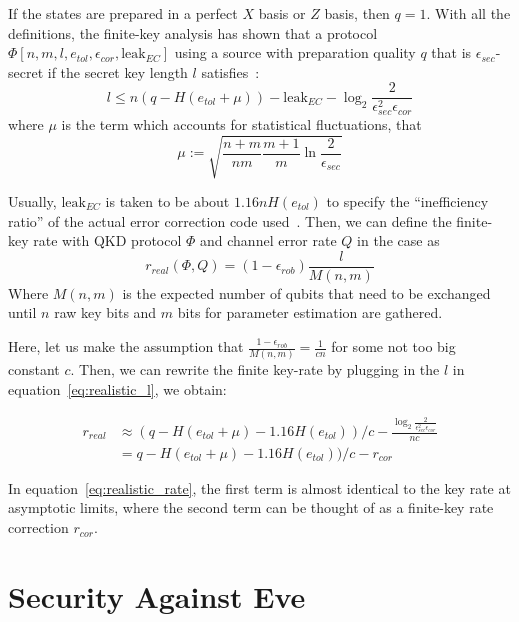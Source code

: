 \documentclass[%
 reprint,
superscriptaddress,
 amsmath,amssymb,
 aps,
]{revtex4-2}
\begin{document}
If the states are prepared in a perfect $X$ basis or $Z$ basis, then $q=1$. With all the definitions, the finite-key analysis has shown that a protocol $\Phi[n, m, l, e_{tol}, \epsilon_{cor}, \text{leak}_{EC}]$ using a source with  preparation quality $q$ that is $\epsilon_{sec}$-secret if the secret key length $l$ satisfies~\cite{Finite_key_analysis1}:
\begin{equation}
    l\le n(q-H(e_{tol}+\mu))-\text{leak}_{EC}-\log_2 \frac{2}{\epsilon_{sec}^2\epsilon_{cor}}
    \label{eq:realistic_l}
\end{equation}
where $\mu$ is the term which accounts for statistical fluctuations, that
\begin{equation}
    \mu := \sqrt{\frac{n+m}{nm}\frac{m+1}{m}\ln\frac{2}{\epsilon_{sec}}}
\end{equation}

Usually, $\text{leak}_{EC}$ is taken to be about $1.16nH(e_{tol})$ to specify the ``inefficiency ratio'' of the actual error correction code used~\cite{Finite_key_analysis1}. Then, we can define the finite-key rate with QKD protocol $\Phi$ and channel error rate $Q$ in the case as
\begin{equation}
    r_{real}(\Phi, Q) = (1-\epsilon_{rob}) \frac{l}{M(n, m)}
\end{equation}
Where $M(n, m)$ is the expected number of qubits that need to be exchanged until $n$ raw key bits and $m$ bits for parameter estimation are gathered.

Here, let us make the assumption that $\frac{1-\epsilon_{rob}}{M(n, m)}=\frac{1}{cn}$ for some not too big constant $c$. Then, we can rewrite the finite key-rate by plugging in the $l$ in equation~\ref{eq:realistic_l}, we obtain:

\begin{equation}
\begin{split}
    r_{real}&\approx (q-H(e_{tol}+\mu)-1.16H(e_{tol}))/c-\frac{\log_2 \frac{2}{\epsilon_{sec}^2\epsilon_{cor}}}{nc}\\
    &= q-H(e_{tol}+\mu)-1.16H(e_{tol}))/c-r_{cor}
    \end{split}
    \label{eq:realistic_rate}
\end{equation}

In equation~\ref{eq:realistic_rate}, the first term is almost identical to the key rate at asymptotic limits, where the second term can be thought of as a finite-key rate correction $r_{cor}$.

\section{Security Against Eve}
\end{document}
